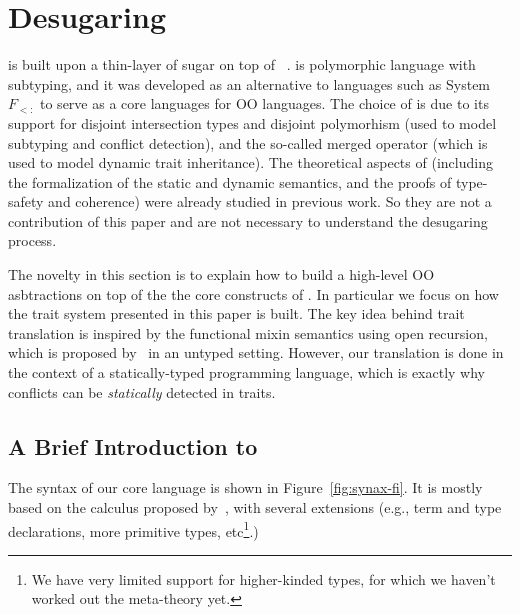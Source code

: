 \section{Desugaring}
\label{sec:desugar}


\name is built upon a thin-layer of sugar on top of \bname~\cite{}.
\bname is polymorphic language with subtyping, and it was developed as
an alternative to languages such as System $F_{<:}$ to serve as a core
languages for OO languages. The choice of \bname is due to its
support for disjoint intersection types and disjoint polymorhism (used
to model subtyping and conflict detection), and the so-called merged
operator (which is used to model dynamic trait inheritance).  The theoretical
aspects of \bname (including the formalization of the static and
dynamic semantics, and the proofs of type-safety and coherence) were
already studied in previous work. So they are not a contribution of
this paper and are not necessary to understand the desugaring process.

The novelty in this section is to explain how to build a high-level OO asbtractions
on top of the the core constructs of \bname. In particular we focus on
how the trait system presented in this paper is built. The key idea behind trait translation is
inspired by the functional mixin semantics using open recursion, which is
proposed by~\citet{cook1989denotational} in an untyped setting. However, our
translation is done in the context of a statically-typed programming language,
which is exactly why conflicts can be \textit{statically} detected in traits.

\subsection{A Brief Introduction to \bname}
The syntax of our core language \bname is shown in Figure~\ref{fig:synax-fi}. It
is mostly based on the calculus proposed by~\citet{alpuimdisjoint}, with several
extensions (e.g., term and type declarations, more primitive types,
etc\footnote{We have very limited support for higher-kinded types, for which we
  haven't worked out the meta-theory yet.}.)

